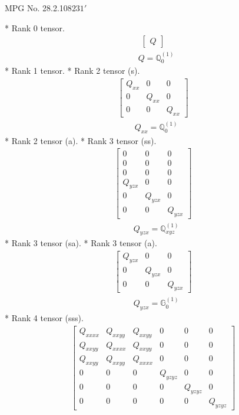\documentclass[fleqn,8pt,landscape]{jsarticle}
\begin{document}
\setcounter{MaxMatrixCols}{32}

\renewcommand{\tablename}{Table~}
\renewcommand{\figurename}{Figure~}
\begin{center}
\LARGE
MPG No. 28.2.108\quad$231'$
\end{center}
* Rank 0 tensor.
\begin{align*}
\begin{bmatrix} Q \end{bmatrix}
\end{align*}
\begin{align*}
& Q = \mathbb{Q}_{0}^{(1)}
\end{align*}
* Rank 1 tensor.
* Rank 2 tensor (s).
\begin{align*}
\begin{bmatrix} Q_{xx} & 0 & 0 \\ 0 & Q_{xx} & 0 \\ 0 & 0 & Q_{xx} \end{bmatrix}
\end{align*}
\begin{align*}
& Q_{xx} = \mathbb{Q}_{0}^{(1)}
\end{align*}
* Rank 2 tensor (a).
* Rank 3 tensor (ss).
\begin{align*}
\begin{bmatrix} 0 & 0 & 0 \\ 0 & 0 & 0 \\ 0 & 0 & 0 \\ Q_{yzx} & 0 & 0 \\ 0 & Q_{yzx} & 0 \\ 0 & 0 & Q_{yzx} \end{bmatrix}
\end{align*}
\begin{align*}
& Q_{yzx} = \mathbb{Q}_{xyz}^{(1)}
\end{align*}
* Rank 3 tensor (sa).
* Rank 3 tensor (a).
\begin{align*}
\begin{bmatrix} Q_{yzx} & 0 & 0 \\ 0 & Q_{yzx} & 0 \\ 0 & 0 & Q_{yzx} \end{bmatrix}
\end{align*}
\begin{align*}
& Q_{yzx} = \mathbb{G}_{0}^{(1)}
\end{align*}
* Rank 4 tensor (sss).
\begin{align*}
\begin{bmatrix} Q_{xxxx} & Q_{xxyy} & Q_{xxyy} & 0 & 0 & 0 \\ Q_{xxyy} & Q_{xxxx} & Q_{xxyy} & 0 & 0 & 0 \\ Q_{xxyy} & Q_{xxyy} & Q_{xxxx} & 0 & 0 & 0 \\ 0 & 0 & 0 & Q_{yzyz} & 0 & 0 \\ 0 & 0 & 0 & 0 & Q_{yzyz} & 0 \\ 0 & 0 & 0 & 0 & 0 & Q_{yzyz} \end{bmatrix}
\end{align*}
\end{document}
